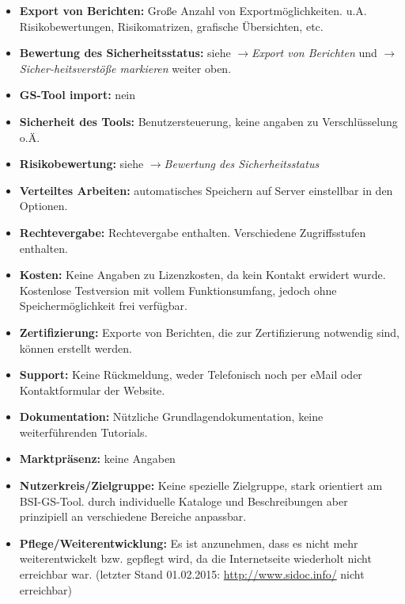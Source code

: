 \begin{itemize}
\item \textbf{Export von Berichten:} Große Anzahl von Exportmöglichkeiten. u.A. Risikobewertungen, Risikomatrizen, grafische Übersichten, etc.
\item \textbf{Bewertung des Sicherheitsstatus:} siehe $\rightarrow$\textit{Export von Berichten} und $\rightarrow$\textit{Sicher-heitsverstöße markieren} weiter oben.
\item \textbf{GS-Tool import:} nein
\item \textbf{Sicherheit des Tools:} Benutzersteuerung, keine angaben zu Verschlüsselung o.Ä.
\item \textbf{Risikobewertung:} siehe $\rightarrow$\textit{Bewertung des Sicherheitsstatus}
\item \textbf{Verteiltes Arbeiten:} automatisches Speichern auf Server einstellbar in den Optionen.
\item \textbf{Rechtevergabe:} Rechtevergabe enthalten. Verschiedene Zugriffsstufen enthalten.
\item \textbf{Kosten:} Keine Angaben zu Lizenzkosten, da kein Kontakt erwidert wurde. Kostenlose Testversion mit vollem Funktionsumfang, jedoch ohne Speichermöglichkeit frei verfügbar.
\item \textbf{Zertifizierung:} Exporte von Berichten, die zur Zertifizierung notwendig sind, können erstellt werden.
\item \textbf{Support:} Keine Rückmeldung, weder Telefonisch noch per eMail oder Kontaktformular der Website.
\item \textbf{Dokumentation:} Nützliche Grundlagendokumentation, keine weiterführenden Tutorials.
\item \textbf{Marktpräsenz:} keine Angaben
\item \textbf{Nutzerkreis/Zielgruppe:} Keine spezielle Zielgruppe, stark orientiert am BSI-GS-Tool. durch individuelle Kataloge und Beschreibungen aber prinzipiell an verschiedene Bereiche anpassbar.
\item \textbf{Pflege/Weiterentwicklung:} Es ist anzunehmen, dass es nicht mehr weiterentwickelt bzw. gepflegt wird, da die Internetseite wiederholt nicht erreichbar war. (letzter Stand 01.02.2015: \url{http://www.sidoc.info/} nicht erreichbar)

\end{itemize}




